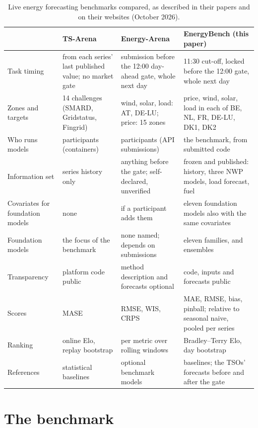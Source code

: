 \documentclass[11pt,a4paper]{article}
\begin{document}
\begin{table}[t]
\centering\small
\caption{Live energy forecasting benchmarks compared, as described in their papers and on their websites (October 2026).}
\label{tab:compare}
\begin{tabularx}{\linewidth}{@{}>{\raggedright\arraybackslash}p{2.7cm}YYY@{}}
\toprule
& TS-Arena~\cite{tsarena} & Energy-Arena~\cite{energyarena} & EnergyBench (this paper) \\
\midrule
Task timing & from each series' last published value; no market gate & submission before the 12:00 day-ahead gate, whole next day & 11:30 cut-off, locked before the 12:00 gate, whole next day \\
Zones and targets & 14 challenges (SMARD, Gridstatus, Fingrid) & wind, solar, load: AT, DE-LU; price: 15 zones & price, wind, solar, load in each of BE, NL, FR, DE-LU, DK1, DK2 \\
Who runs models & participants (containers) & participants (API submissions) & the benchmark, from submitted code \\
Information set & series history only & anything before the gate; self-declared, unverified & frozen and published: history, three NWP models, load forecast, fuel \\
Covariates for foundation models & none & if a participant adds them & eleven foundation models also with the same covariates \\
Foundation models & the focus of the benchmark & none named; depends on submissions & eleven families, and ensembles \\
Transparency & platform code public & method description and forecasts optional & code, inputs and forecasts public \\
Scores & MASE & RMSE, WIS, CRPS & MAE, RMSE, bias, pinball; relative to seasonal naive, pooled per series \\
Ranking & online Elo, replay bootstrap & per metric over rolling windows & Bradley--Terry Elo, day bootstrap \\
References & statistical baselines & optional benchmark models & baselines; the TSOs' forecasts before and after the gate \\
\bottomrule
\end{tabularx}
\end{table}

\section{The benchmark}
\end{document}
